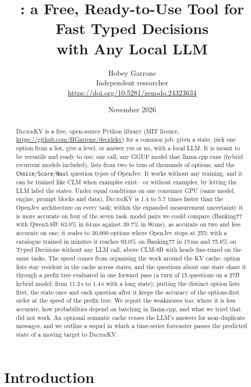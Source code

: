 \documentclass[11pt]{article}
\title{\dkv: a Free, Ready-to-Use Tool for Fast Typed Decisions\\with Any Local LLM}
\author{Hobey Garrone\\Independent researcher\\\small\url{https://doi.org/10.5281/zenodo.24323634}}
\date{November 2026}
\newcommand{\dkv}{\textsc{DecideKV}}
\newcommand{\ms}{\,ms}
\begin{document}
\maketitle

\begin{abstract}
\dkv{} is a free, open-source Python library (MIT licence, \url{https://github.com/HGarrone/decidekv}) for a common
job: given a state, pick one option from a list, give a level, or answer yes or no, with a local LLM. It is meant to
be versatile and ready to use: one call, any GGUF model that llama.cpp runs (hybrid recurrent models included), lists
from two to tens of thousands of options, and the \texttt{Choice}/\texttt{Score}/\texttt{Noul} question types of
OpenJev. It works without any training, and it can be trained like CLM when examples exist---or without examples, by
letting the LLM label the states. Under equal conditions on one consumer GPU (same model, engine, prompt blocks and
data), \dkv{} is 1.4 to 5.7 times faster than the OpenJev architecture on every task; within the expanded measurement
uncertainty it is more accurate on four of the seven task--model pairs we could compare (Banking77 with Qwen3-8B:
63.0\% in 64\ms{} against 39.7\% in 90\ms), as accurate on two and less accurate on one; it scales to
30{,}000 options where OpenJev stops at 255; with a catalogue trained in minutes it reaches 93.0\% on Banking77 in
15\ms{} and 75.6\% on Typed Decisions without any LLM call, above CLM-8B with heads fine-tuned on the same tasks. The
speed comes from organising the work around the KV cache: option lists stay resident in the cache across states, and
the questions about one state share it through a prefix tree evaluated in one forward pass (a turn of 15 questions on
a 27B hybrid model: from 11.2\,s to 1.4\,s with a long state); putting the distinct option lists first, the state
once and each question after it keeps the accuracy of the options-first order at the speed of the prefix tree. We report the weaknesses too: where it is less accurate,
how probabilities depend on batching in llama.cpp, and what we tried that did not work. An optional semantic cache
reuses the LLM's answers for near-duplicate messages, and we outline a sequel in which a time-series forecaster passes
the predicted state of a moving target to \dkv.
\end{abstract}

\section{Introduction}
\end{document}
